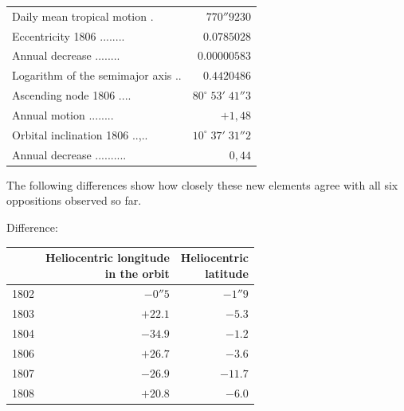 \begin{center}\fontsize{9}{11}\selectfont\setlength{\tabcolsep}{5pt}\renewcommand{\arraystretch}{1.15}\begin{tabular}{lr} Daily mean tropical motion .\; & $770''9230$\\ Eccentricity 1806 .\;.\;.\;.\;.\;.\;.\;.\; & $0.0785028$\\ Annual decrease .\;.\;.\;.\;.\;.\;.\;.\; & $0.00000583$\\ Logarithm of the semimajor axis .\;.\; & $0.4420486$\\ Ascending node 1806 .\;.\;.\;.\; & $80^\circ\;53'\;41''3$\\ Annual motion .\;.\;.\;.\;.\;.\;.\;.\; & $+1{,}48$\\ Orbital inclination 1806 .\;.\;,\;.\;.\; & $10^\circ\;37'\;31''2$\\ Annual decrease .\;.\;.\;.\;.\;.\;.\;.\;.\;.\; & $0{,}44$\\
\end{tabular}\end{center}


\par\indent The following differences show how closely these new elements agree with all six oppositions observed so far.

\begin{center} Difference:
\end{center}


\begin{center}\fontsize{10}{12}\selectfont\setlength{\tabcolsep}{5pt}\renewcommand{\arraystretch}{1.15}\begin{tabular}{crr}  & \shortstack{Heliocentric longitude\\in the orbit} & \shortstack{Heliocentric\\latitude}\\\hline 1802 & $-0''5$ & $-1''9$\\ 1803 & $+22.1$ & $-5.3$\\ 1804 & $-34.9$ & $-1.2$\\ 1806 & $+26.7$ & $-3.6$\\ 1807 & $-26.9$ & $-11.7$\\ 1808 & $+20.8$ & $-6.0$\\
\end{tabular}\end{center}


